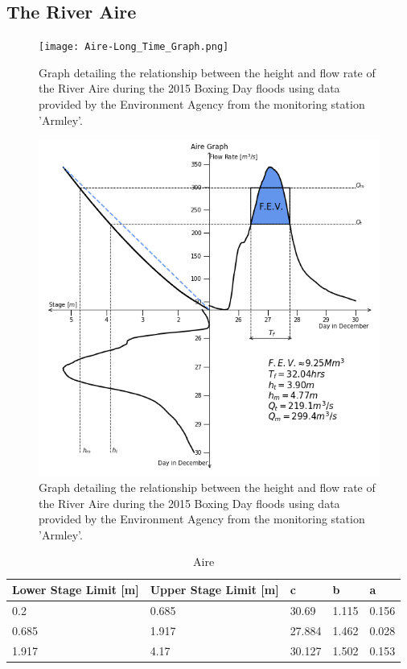 \documentclass[11pt,a4paper]{article}
\begin{document}
\subsection{The River Aire}
\begin{figure}[H]
\begin{center}
\texttt{[image: Aire-Long\_Time\_Graph.png]}
\caption{Graph detailing the relationship between the height and flow rate of the River Aire during the 2015 Boxing Day floods using data provided by the Environment Agency from the monitoring station 'Armley'.}
\end{center}
\end{figure}
\begin{figure}[H]
\begin{center}
\includegraphics[scale=0.45]{Aire-Quadrant_Graph.png}
\caption{Graph detailing the relationship between the height and flow rate of the River Aire during the 2015 Boxing Day floods using data provided by the Environment Agency from the monitoring station 'Armley'.}
\end{center}
\end{figure}
\begin{table}[H]
\centering
\begin{tabular}{|l|l|l|l|l|}
\hline
Lower Stage Limit {[}m{]} & Upper Stage Limit {[}m{]} & c & b & a \\
\hline
0.2 & 0.685 & 30.69 & 1.115 & 0.156 \\
0.685 & 1.917 & 27.884 & 1.462 & 0.028 \\
1.917 & 4.17 & 30.127 & 1.502 & 0.153 \\
\hline
\end{tabular}
\caption{Aire}
\end{table}
\end{document}
